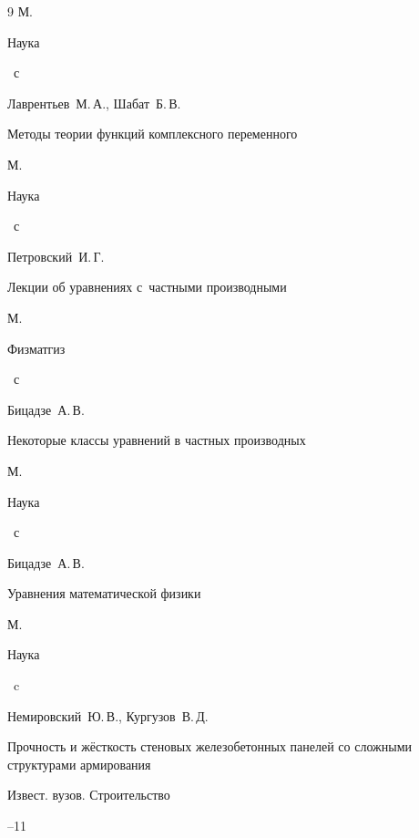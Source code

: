 \begin{thebibliography}{9}
\publaddr М.

\publ Наука


~с




\by Лаврентьев~М.\,А., Шабат~Б.\,В. 

\book Методы теории функций комплексного переменного

\publaddr М.

\publ Наука


~с




\by Петровский~И.\,Г.

\book Лекции об уравнениях с~частными производными 

\publaddr М.

\publ Физматгиз


~с




\by Бицадзе~А.\,В. 

\book Некоторые классы уравнений в частных производных

\publaddr М.

\publ Наука


~с




\by Бицадзе~А.\,В. 

\book Уравнения математической физики 

\publaddr М.

\publ Наука


~c






\by Немировский~Ю.\,В., Кургузов~В.\,Д. 

\paper Прочность и жёсткость стеновых  железобетонных панелей со сложными структурами армирования 

\jour Извест. вузов. Строительство



--11

\end{thebibliography}









\makeengtitle







%

